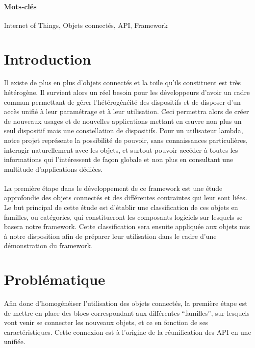 \documentclass[nocopyrightspace]{sigplanconf}
\begin{document}
\paragraph{Mots-clés}
Internet of Things, Objets connectés, API, Framework

\section{Introduction}
	\paragraph{}
	Il existe de plus en plus d'objets connectés et la toile qu'ils constituent est très hétérogène. Il survient alors un réel besoin pour les développeurs d'avoir un cadre commun permettant de gérer l'hétérogénéité des dispositifs et de disposer d'un accès unifié à leur paramétrage et à leur utilisation. Ceci permettra alors de créer de nouveaux usages et de nouvelles applications mettant en œuvre non plus un seul dispositif mais une constellation de dispositifs. Pour un utilisateur lambda, notre projet représente la possibilité de pouvoir, sans connaissances particulières, interagir naturellement avec les objets, et surtout pouvoir accéder à toutes les informations qui l’intéressent de façon globale et non plus en consultant une multitude d’applications dédiées. 
	
	\paragraph{}
	La première étape dans le développement de ce framework est une étude approfondie des objets connectés et des différentes contraintes qui leur sont liées. Le but principal de cette étude est d’établir une classification de ces objets en familles, ou catégories, qui constitueront les composants logiciels sur lesquels se basera notre framework. Cette classification sera ensuite appliquée aux objets mis à notre disposition afin de préparer leur utilisation dans le cadre d'une démonstration du framework.

\section{Problématique}
	\paragraph{}
	Afin donc d’homogénéiser l’utilisation des objets connectés, la première étape est de mettre en place des blocs correspondant aux différentes “familles”, sur lesquels vont venir se connecter les nouveaux objets, et ce en fonction de ses caractéristiques. Cette connexion est à l’origine de la réunification des API en une unifiée.
\end{document}
